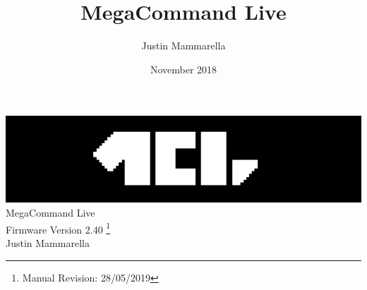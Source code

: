 \documentclass[openany,a4paper,12pt]{book}
\begin{document}
\author{Justin Mammarella}
\title{MegaCommand Live}
\date{November 2018}

\frontmatter
\begin{titlepage}

	\begin{center}
	\vspace*{5.75cm}
	\includegraphics{mcl_logo_black_short.png}
    \vspace*{1.00cm}
	\LARGE
	\vspace*{0.65cm}
	\\MegaCommand Live
    \large
	\\Firmware Version 2.40
	\footnote{Manual Revision: 28/05/2019}
    \vspace*{2cm}
    \\Justin Mammarella
\end{center}
\end{titlepage}


\tableofcontents

\mainmatter






























\backmatter

\end{document}
